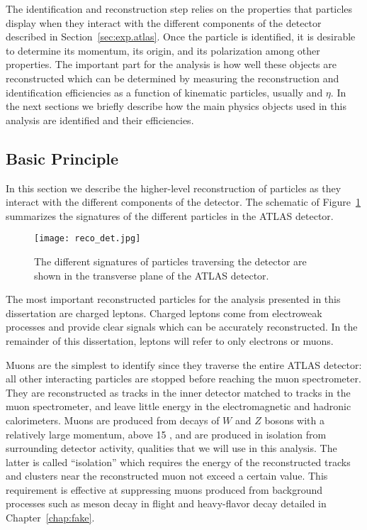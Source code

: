 
The identification and reconstruction step relies on the properties that particles display when they interact with the different components of the detector
described in Section~\ref{sec:exp.atlas}.
Once the particle is identified, it is desirable to determine its momentum, its origin, and its polarization among other properties.
The important part for the analysis is how well these objects are reconstructed which can be determined by measuring the reconstruction and 
identification efficiencies as a function of kinematic particles, 
usually \pt and $\eta$.
In the next sections we briefly describe how the main physics objects used in 
this analysis are identified and their efficiencies.

\subsection{Basic Principle}

In this section we describe the higher-level reconstruction of particles
as they interact with the different components of the detector.
The schematic of Figure~\ref{fig:exp.atlas.reco.det} 
summarizes the signatures of the different particles in the ATLAS 
detector.



\begin{figure}[htb!]
\centering
\texttt{[image: reco\_det.jpg]}
\caption{ The different signatures of particles traversing 
the detector are shown in the transverse plane of the ATLAS detector.}%
\label{fig:exp.atlas.reco.det}
\end{figure} 


The most important reconstructed particles for the analysis presented 
in this dissertation are charged leptons. 
Charged leptons come from  electroweak processes and  
provide  clear signals which can be accurately reconstructed.
In the remainder of this dissertation, leptons will refer to 
only electrons or muons.

Muons are the simplest to identify since they traverse
the entire ATLAS detector: all other 
interacting particles are stopped before reaching the muon spectrometer.
They are reconstructed as tracks in the inner detector matched to tracks in the
muon spectrometer, 
and leave little energy in the electromagnetic and hadronic calorimeters.  
Muons are produced from decays of $W$ and $Z$ bosons with a relatively 
large momentum, above 15 \GeV, and are produced in isolation from surrounding
detector activity, qualities that we will use in this analysis.
The latter is called ``isolation'' which requires 
the energy of the reconstructed tracks and clusters near the reconstructed 
muon not exceed a certain value. 
This requirement is effective at suppressing muons produced
from background processes such as meson decay in flight and heavy-flavor decay
detailed in Chapter~\ref{chap:fake}.

